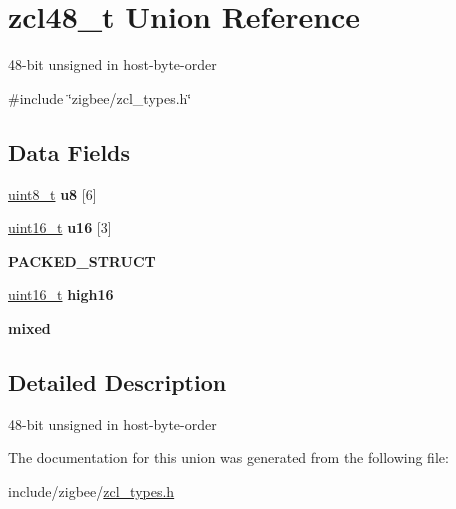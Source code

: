\hypertarget{unionzcl48__t}{\section{zcl48\-\_\-t Union Reference}
\label{unionzcl48__t}
}


48-\/bit unsigned in host-\/byte-\/order  




{\ttfamily \#include \char`\"{}zigbee/zcl\-\_\-types.\-h\char`\"{}}

\subsection*{Data Fields}
\begin{DoxyCompactItemize}
\item 
\hypertarget{group__zcl__types_ga0989b828fcba5b50454c134bb08c46ac}{\hyperlink{group__hal_gae1affc9ca37cfb624959c866a73f83c2}{uint8\-\_\-t} {\bfseries u8} \mbox{[}6\mbox{]}}\label{group__zcl__types_ga0989b828fcba5b50454c134bb08c46ac}

\item 
\hypertarget{group__zcl__types_ga41b61059ce2e09f103fbd64c9abe5bff}{\hyperlink{group__hal_ga5a8b2dc9e45a9ee81a94ef304fb62505}{uint16\-\_\-t} {\bfseries u16} \mbox{[}3\mbox{]}}\label{group__zcl__types_ga41b61059ce2e09f103fbd64c9abe5bff}

\item 
{\bfseries P\-A\-C\-K\-E\-D\-\_\-\-S\-T\-R\-U\-C\-T}
\item 
\hypertarget{group__zcl__types_ga8496547ebd48f63b4a6d8a8bd059c89e}{\hyperlink{group__hal_ga5a8b2dc9e45a9ee81a94ef304fb62505}{uint16\-\_\-t} {\bfseries high16}}\label{group__zcl__types_ga8496547ebd48f63b4a6d8a8bd059c89e}

\item 
\hypertarget{group__zcl__types_ga1c5d0403e0a7a57d3778e56e8798faa8}{{\bfseries mixed}}\label{group__zcl__types_ga1c5d0403e0a7a57d3778e56e8798faa8}

\end{DoxyCompactItemize}


\subsection{Detailed Description}
48-\/bit unsigned in host-\/byte-\/order 

The documentation for this union was generated from the following file\-:\begin{DoxyCompactItemize}
\item 
include/zigbee/\hyperlink{zcl__types_8h}{zcl\-\_\-types.\-h}\end{DoxyCompactItemize}
